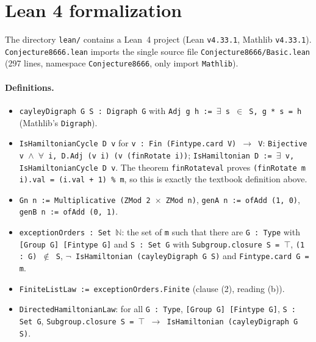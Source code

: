 \documentclass[11pt]{article}
\theoremstyle{definition}
\theoremstyle{remark}
\renewcommand{\_}{\oldus\allowbreak}
\begin{document}
\section{Lean 4 formalization}\label{sec:lean}

The directory \texttt{lean/} contains a Lean~4 project (Lean \texttt{v4.33.1}, Mathlib \texttt{v4.33.1}).
\texttt{Conjecture8666.lean} imports the single source file \texttt{Conjecture8666/Basic.lean}
(297 lines, namespace \texttt{Conjecture8666}, only import \texttt{Mathlib}).

\paragraph{Definitions.}
\begin{itemize}
\item \texttt{cayleyDigraph G S : Digraph G} with \texttt{Adj g h := $\exists$ s $\in$ S, g * s = h}
  (Mathlib's \texttt{Digraph}).
\item \texttt{IsHamiltonianCycle D v} for \texttt{v : Fin (Fintype.card V) $\to$ V}:
  \texttt{Bijective v $\wedge$ $\forall$ i, D.Adj (v i) (v (finRotate \_ i))}; \texttt{IsHamiltonian D :=
  $\exists$ v, IsHamiltonianCycle D v}. The theorem \texttt{finRotate\_val} proves
  \texttt{(finRotate m i).val = (i.val + 1) \% m}, so this is exactly the textbook definition above.
\item \texttt{Gn n := Multiplicative (ZMod 2 $\times$ ZMod n)}, \texttt{genA n := ofAdd (1, 0)},
  \texttt{genB n := ofAdd (0, 1)}.
\item \texttt{exceptionOrders : Set $\mathbb{N}$}: the set of \texttt{m} such that there are
  \texttt{G : Type} with \texttt{[Group G] [Fintype G]} and \texttt{S : Set G} with
  \texttt{Subgroup.closure S = $\top$}, \texttt{(1 : G) $\notin$ S},
  \texttt{$\neg$ IsHamiltonian (cayleyDigraph G S)} and \texttt{Fintype.card G = m}.
\item \texttt{FiniteListLaw := exceptionOrders.Finite} (clause (2), reading (b)).
\item \texttt{DirectedHamiltonianLaw}: for all \texttt{G : Type}, \texttt{[Group G] [Fintype G]},
  \texttt{S : Set G}, \texttt{Subgroup.closure S = $\top$ $\to$ IsHamiltonian (cayleyDigraph G S)}.
\end{itemize}
\end{document}
